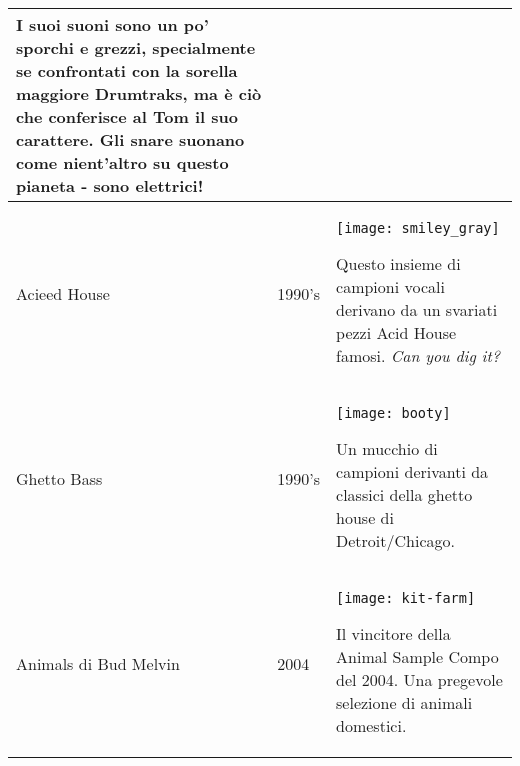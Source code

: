 \begin{xtabular}{p{2.02cm}|l|p{7.8cm}}
I suoi suoni sono un po' sporchi e grezzi, specialmente se confrontati con la sorella maggiore Drumtraks, ma è ciò che conferisce al Tom il suo carattere. Gli snare suonano come nient'altro su questo pianeta - sono elettrici! \\
\hline
Acieed House & 1990's & 
\texttt{[image: smiley\_gray]}

Questo insieme di campioni vocali derivano da un svariati pezzi Acid House famosi. \textit{Can you dig it?} \\
\hline
Ghetto Bass & 1990's & 
\texttt{[image: booty]} 

Un mucchio di campioni derivanti da classici della ghetto house di Detroit/Chicago.\\
\hline
Animals \linebreak di Bud Melvin & 2004 & 
\texttt{[image: kit-farm]} 

Il vincitore della Animal Sample Compo del 2004. Una pregevole selezione di animali domestici. \\
\end{xtabular}

